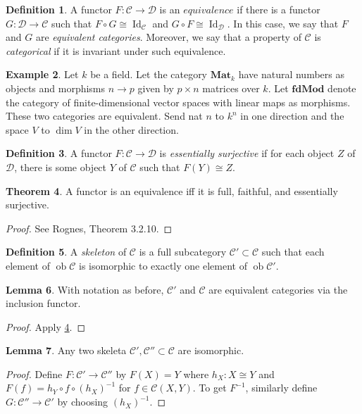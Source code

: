 \documentclass[10pt,letterpaper,cm]{nupset}
\theoremstyle{definition}
\newtheorem{definition}{Definition}
\newtheorem{exmp}[definition]{Example}
\theoremstyle{theorem}
\newtheorem{theorem}[definition]{Theorem}
\newtheorem{lemma}[definition]{Lemma}
\theoremstyle{remark}
\newcommand{\1}{\mathbf{1}}
\renewcommand{\c}{\mathscr{C}}
\renewcommand{\d}{\mathscr{D}}
\newcommand{\0}{\vec 0}
\DeclareMathOperator{\id}{Id}
\DeclareMathOperator{\ob}{ob}
\begin{document}
\begin{definition}
A functor $F: \c \to \d$ is an $\textit{equivalence}$ if there is a functor $G: \d \to \c$ such that $F \circ G \cong \id_{\c}$ and $G \circ F \cong \id_{\d}$. In this case, we say that $F$ and $G$ are \textit{equivalent categories}. Moreover, we say that a property of $\c$ is \textit{categorical} if it is invariant under such equivalence.
\end{definition}

\begin{exmp}
Let $k$ be a field. Let the category $\mathbf{Mat}_k$  have natural numbers as objects and morphisms $n \to p$ given by $p \times n$ matrices over $k$. Let $\mathbf{fdMod}$ denote the category of finite-dimensional vector spaces with linear maps as morphisms. These two categories are equivalent. Send nat $n$ to $k^n$ in one direction and the space $V$ to $\dim V$ in the other direction.    
\end{exmp}

\begin{definition}
A functor $F : \c \to \d$ is \textit{essentially surjective} if for each object $Z$ of  $\d$, there is some object $Y$ of $\c$ such that $F(Y) \cong Z$.
\end{definition}

\begin{theorem}\label{equiv}
A functor is an equivalence iff it is full, faithful, and essentially surjective. 
\end{theorem}
\begin{proof}
See Rognes, Theorem 3.2.10.
\end{proof}

\begin{definition}
A \textit{skeleton} of $\c$ is a full subcategory $\c' \subset \c$ such that each element of $\ob \c$ is isomorphic to exactly one element of $\ob \c'$.
\end{definition}

\begin{lemma}
With notation as before, $\c'$ and $\c$ are equivalent categories via the inclusion functor.
\end{lemma}
\begin{proof}
Apply \cref{equiv}.
\end{proof}

\begin{lemma}
Any two skeleta $\c', \c'' \subset \c$ are isomorphic.
\end{lemma}
\begin{proof}
Define $F: \c' \to \c''$ by $F(X) =Y$ where $h_X: X \cong Y$ and $F(f) = h_Y \circ f \circ (h_X)^{-1}$ for $f\in \c(X, Y)$. 
To get $F^{-1}$, similarly define $G: \c'' \to \c'$ by choosing $(h_X)^{-1}$.
\end{proof}
\end{document}
